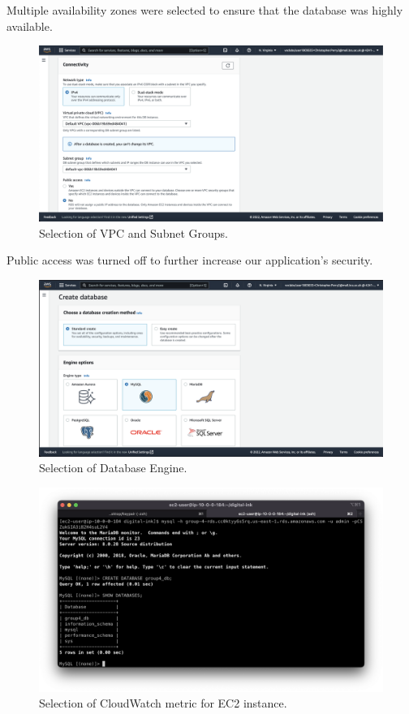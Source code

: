Multiple availability zones were selected to ensure that the database was highly available.

\begin{figure}[!htbp]
    \centering
    \includegraphics[width=\textwidth]{resources/rds/rds-connectivity-1}
    \caption{Selection of VPC and Subnet Groups.}
    \label{fig:rds-connecting}
\end{figure}

Public access was turned off to further increase our application's security.

\begin{figure}[!htbp]
    \centering
    \includegraphics[width=\textwidth]{resources/rds/rds-create-engine}
    \caption{Selection of Database Engine.}
    \label{fig:rds-engine}
\end{figure}

\begin{figure}[!htbp]
    \centering
    \includegraphics[width=\textwidth]{resources/rds/rds-database-creation}
    \caption{Selection of CloudWatch metric for EC2 instance.}
    \label{fig:rds-db-create}
\end{figure}

